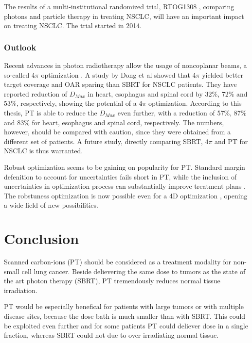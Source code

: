 The results of a multi-institutional randomized trial, RTOG1308 \cite{RTOG1308}, comparing photons and particle therapy in treating NSCLC,
will have an important impact on treating NSCLC. The trial started in 2014.


\subsection{Outlook}

Recent advances in photon radiotherapy allow the usage of noncoplanar beams, a so-called 4$\pi$ optimization \cite{Dong2013}. A study by Dong et al \cite{Dong2013b} showed that
4$\pi$ yielded better target coverage and OAR sparing than SBRT for NSCLC patients. 
They have reported reduction of $D_{Max}$ in heart, esophagus and spinal cord by 32\%, 72\% and 53\%, respectively, showing
the potential of a 4$\pi$ optimization. According to this thesis, PT is able to reduce the $D_{Max}$ even further, with a reduction of 57\%, 87\% and 83\% for heart, esophagus and spinal cord,
respectively. The numbers, however, should be compared with caution, since they were obtained from a different set of patients. 
A future study, directly comparing SBRT, $4\pi$ and PT for NSCLC is thus warranted.

Robust optimization seems to be gaining on popularity for PT. Standard margin defenition to account for uncertainties fails short in PT, while the inclusion of uncertainties in 
optimization process can substantially improve treatment plans \cite{Chen2012}. The robstuness optimization is now possible even for a 4D optimization \cite{Liu2016}, opening a wide
field of new possibilities. 
\newpage

\chapter{Conclusion}

Scanned carbon-ions (PT) should be considered as a treatment modality for non-small cell lung cancer. Beside delievering 
the same dose to tumors as the state of the art photon therapy (SBRT), PT tremendously reduces normal tissue irradiation.

PT would be especially benefical for patients with large tumors or with multiple disease sites, because the dose bath is much
smaller than with SBRT. This could be exploited even further and for some patients PT could deliever dose in a single fraction, whereas SBRT could not due to over irradiating
normal tissue.

